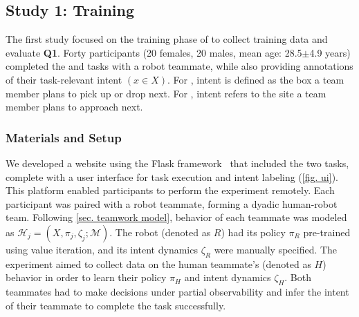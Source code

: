 \subsection{Study 1: Training}
\label{sec: data collection}
The first study focused on the training phase of \coach to collect training data and evaluate \textbf{Q1}. Forty participants (20 females, 20 males, mean age: 28.5$\pm$4.9 years) completed the \movers and \rescue tasks with a robot teammate, while also providing annotations of their task-relevant intent $(x \in X)$. For \movers, intent is defined as the box a team member plans to pick up or drop next. For \rescue, intent refers to the site a team member plans to approach next.

\subsubsection{Materials and Setup}
We developed a website using the Flask framework~\cite{grinberg2018flask} that included the two tasks, complete with a user interface for task execution and intent labeling (\cref{fig. ui}). This platform enabled participants to perform the experiment remotely. Each participant was paired with a robot teammate, forming a dyadic human-robot team. Following \cref{sec. teamwork model}, behavior of each teammate was modeled as  $\mathcal{H}_j = (X, \pi_j, \zeta_j; \mathcal{M})$. The robot (denoted as $R$) had its policy $\pi_R$ pre-trained using value iteration, and its intent dynamics $\zeta_R$ were manually specified. The experiment aimed to collect data on the human teammate's (denoted as $H$) behavior in order to learn their policy $\pi_H$ and intent dynamics $\zeta_H$. Both teammates had to make decisions under partial observability and infer the intent of their teammate to complete the task successfully.

